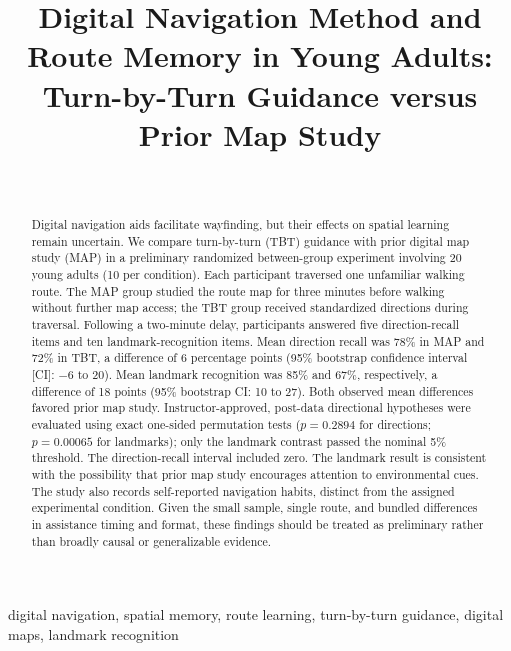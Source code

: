 \documentclass[conference]{IEEEtran}
\title{Digital Navigation Method and Route Memory in Young Adults: Turn-by-Turn Guidance versus Prior Map Study}
\author{\IEEEauthorblockN{Ayaulym Serikova and Gulnar Khabibullayeva}\\\IEEEauthorblockA{Narxoz University, School of Digital Technologies\\Almaty, Kazakhstan}}
\begin{document}
\maketitle
\begin{abstract}
Digital navigation aids facilitate wayfinding, but their effects on spatial learning remain uncertain. We compare turn-by-turn (TBT) guidance with prior digital map study (MAP) in a preliminary randomized between-group experiment involving 20 young adults (10 per condition). Each participant traversed one unfamiliar walking route. The MAP group studied the route map for three minutes before walking without further map access; the TBT group received standardized directions during traversal. Following a two-minute delay, participants answered five direction-recall items and ten landmark-recognition items. Mean direction recall was 78\% in MAP and 72\% in TBT, a difference of 6 percentage points (95\% bootstrap confidence interval [CI]: $-6$ to 20). Mean landmark recognition was 85\% and 67\%, respectively, a difference of 18 points (95\% bootstrap CI: 10 to 27). Both observed mean differences favored prior map study. Instructor-approved, post-data directional hypotheses were evaluated using exact one-sided permutation tests ($p=0.2894$ for directions; $p=0.00065$ for landmarks); only the landmark contrast passed the nominal 5\% threshold. The direction-recall interval included zero. The landmark result is consistent with the possibility that prior map study encourages attention to environmental cues. The study also records self-reported navigation habits, distinct from the assigned experimental condition. Given the small sample, single route, and bundled differences in assistance timing and format, these findings should be treated as preliminary rather than broadly causal or generalizable evidence.
\end{abstract}
\begin{IEEEkeywords}
digital navigation, spatial memory, route learning, turn-by-turn guidance, digital maps, landmark recognition
\end{IEEEkeywords}




\printbibliography
\end{document}
